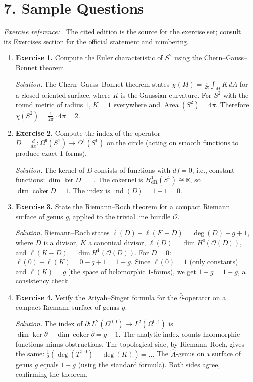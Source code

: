 \section*{7. Sample Questions}
\emph{Exercise reference:} \cite{index_theory_ref1}. The cited edition is the source for the exercise set; consult its Exercises section for the official statement and numbering.
\begin{enumerate}[leftmargin=*,itemsep=0.9em]
\item \textbf{Exercise 1.} Compute the Euler characteristic of $S^2$ using the Chern--Gauss--Bonnet theorem.

\emph{Solution.} The Chern--Gauss--Bonnet theorem states $\chi(M)=\frac{1}{2\pi}\int_M K\,dA$ for a closed oriented surface, where $K$ is the Gaussian curvature. For $S^2$ with the round metric of radius $1$, $K=1$ everywhere and $\operatorname{Area}(S^2)=4\pi$. Therefore $\chi(S^2)=\frac{1}{2\pi}\cdot 4\pi=2$.

\item \textbf{Exercise 2.} Compute the index of the operator $D=\frac{d}{dx}:\Omega^0(S^1)\to\Omega^1(S^1)$ on the circle (acting on smooth functions to produce exact 1-forms).

\emph{Solution.} The kernel of $D$ consists of functions with $df=0$, i.e., constant functions: $\dim\ker D=1$. The cokernel is $H^1_{\mathrm{dR}}(S^1)\cong\mathbb{R}$, so $\dim\operatorname{coker}D=1$. The index is $\operatorname{ind}(D)=1-1=0$.

\item \textbf{Exercise 3.} State the Riemann--Roch theorem for a compact Riemann surface of genus $g$, applied to the trivial line bundle $\mathcal{O}$.

\emph{Solution.} Riemann--Roch states $\ell(D)-\ell(K-D)=\deg(D)-g+1$, where $D$ is a divisor, $K$ a canonical divisor, $\ell(D)=\dim H^0(\mathcal{O}(D))$, and $\ell(K-D)=\dim H^1(\mathcal{O}(D))$. For $D=0$: $\ell(0)-\ell(K)=0-g+1=1-g$. Since $\ell(0)=1$ (only constants) and $\ell(K)=g$ (the space of holomorphic $1$-forms), we get $1-g=1-g$, a consistency check.

\item \textbf{Exercise 4.} Verify the Atiyah--Singer formula for the $\bar\partial$-operator on a compact Riemann surface of genus $g$.

\emph{Solution.} The index of $\bar\partial:L^2(\Omega^{0,0})\to L^2(\Omega^{0,1})$ is $\dim\ker\bar\partial-\dim\operatorname{coker}\bar\partial=g-1$. The analytic index counts holomorphic functions minus obstructions. The topological side, by Riemann--Roch, gives the same: $\frac{1}{2}(\deg(T^{1,0})-\deg(K))=\ldots$ The $\hat{A}$-genus on a surface of genus $g$ equals $1-g$ (using the standard formula). Both sides agree, confirming the theorem.


\end{enumerate}
